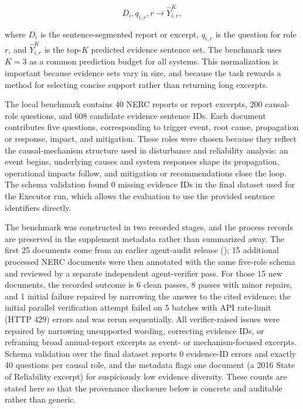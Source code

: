 \documentclass{ieeeaccess}
\begin{document}
\[
D_i, q_{i,r}, r \rightarrow \hat{Y}_{i,r}^{K},
\]

where \(D_i\) is the sentence-segmented report or excerpt, \(q_{i,r}\) is the question for role \(r\), and \(\hat{Y}_{i,r}^{K}\) is the top-\(K\) predicted evidence sentence set. The benchmark uses \(K=3\) as a common prediction budget for all systems. This normalization is important because evidence sets vary in size, and because the task rewards a method for selecting concise support rather than returning long excerpts.

The local benchmark contains 40 NERC reports or report excerpts, 200 causal-role questions, and 608 candidate evidence sentence IDs. Each document contributes five questions, corresponding to trigger event, root cause, propagation or response, impact, and mitigation. These roles were chosen because they reflect the causal-mechanism structure used in disturbance and reliability analysis: an event begins, underlying causes and system responses shape its propagation, operational impacts follow, and mitigation or recommendations close the loop. The schema validation found 0 missing evidence IDs in the final dataset used for the Executor run, which allows the evaluation to use the provided sentence identifiers directly.

The benchmark was constructed in two recorded stages, and the process records are preserved in the supplement metadata rather than summarized away. The first 25 documents come from an earlier agent-audit release (); 15 additional processed NERC documents were then annotated with the same five-role schema and reviewed by a separate independent agent-verifier pass. For those 15 new documents, the recorded outcome is 6 clean passes, 8 passes with minor repairs, and 1 initial failure repaired by narrowing the answer to the cited evidence; the initial parallel verification attempt failed on 5 batches with API rate-limit (HTTP 429) errors and was rerun sequentially. All verifier-raised issues were repaired by narrowing unsupported wording, correcting evidence IDs, or reframing broad annual-report excerpts as event- or mechanism-focused excerpts. Schema validation over the final dataset reports 0 evidence-ID errors and exactly 40 questions per causal role, and the metadata flags one document (a 2016 State of Reliability excerpt) for suspiciously low evidence diversity. These counts are stated here so that the provenance disclosure below is concrete and auditable rather than generic.
\end{document}
